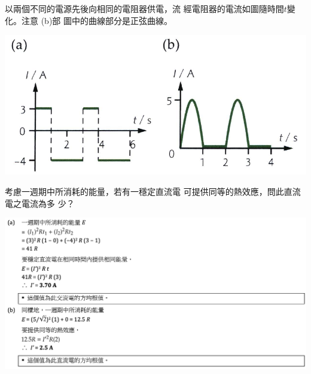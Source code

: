 {
    以兩個不同的電源先後向相同的電阻器供電，流 經電阻器的電流如圖隨時間$t$變化。注意 (b)部 圖中的曲線部分是正弦曲線。
    \par{\par\centering\includegraphics[width=.5\textwidth]{./img/ch_ACtransformer_lq_2024-06-17-20-01-07.png}\par}
    考慮一週期中所消耗的能量，若有一穩定直流電 可提供同等的熱效應，問此直流電之電流為多 少？\par{}
}{
    \par{\par\centering\includegraphics[width=\textwidth]{./img/ch_ACtransformer_lq_2024-06-17-20-35-11.png}\par}
}

